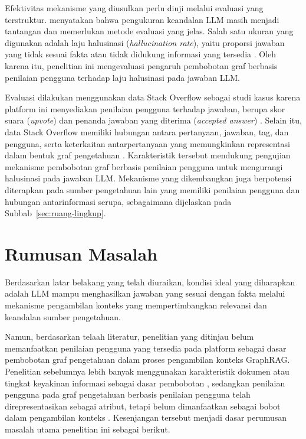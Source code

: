 Efektivitas mekanisme yang diusulkan perlu diuji melalui evaluasi yang terstruktur. \textcite{Gu2026} menyatakan bahwa pengukuran keandalan LLM masih menjadi tantangan dan memerlukan metode evaluasi yang jelas. Salah satu ukuran yang digunakan adalah laju halusinasi (\emph{hallucination rate}), yaitu proporsi jawaban yang tidak sesuai fakta atau tidak didukung informasi yang tersedia \autocite{Syeda2026}. Oleh karena itu, penelitian ini mengevaluasi pengaruh pembobotan graf berbasis penilaian pengguna terhadap laju halusinasi pada jawaban LLM.

Evaluasi dilakukan menggunakan data Stack Overflow sebagai studi kasus karena platform ini menyediakan penilaian pengguna terhadap jawaban, berupa skor suara (\emph{upvote}) dan penanda jawaban yang diterima (\emph{accepted answer}) \autocite{Kleybolte2026}. Selain itu, data Stack Overflow memiliki hubungan antara pertanyaan, jawaban, tag, dan pengguna, serta keterkaitan antarpertanyaan yang memungkinkan representasi dalam bentuk graf pengetahuan \autocite{Fatima2026}. Karakteristik tersebut mendukung pengujian mekanisme pembobotan graf berbasis penilaian pengguna untuk mengurangi halusinasi pada jawaban LLM. Mekanisme yang dikembangkan juga berpotensi diterapkan pada sumber pengetahuan lain yang memiliki penilaian pengguna dan hubungan antarinformasi serupa, sebagaimana dijelaskan pada Subbab~\ref{sec:ruang-lingkup}.

\section{Rumusan Masalah}

Berdasarkan latar belakang yang telah diuraikan, kondisi ideal yang diharapkan adalah LLM mampu menghasilkan jawaban yang sesuai dengan fakta melalui mekanisme pengambilan konteks yang mempertimbangkan relevansi dan keandalan sumber pengetahuan.

Namun, berdasarkan telaah literatur, penelitian yang ditinjau belum memanfaatkan penilaian pengguna yang tersedia pada platform sebagai dasar pembobotan graf pengetahuan dalam proses pengambilan konteks GraphRAG. Penelitian sebelumnya lebih banyak menggunakan karakteristik dokumen atau tingkat keyakinan informasi sebagai dasar pembobotan \autocite{Shi2026, Asghari2026}, sedangkan penilaian pengguna pada graf pengetahuan berbasis penilaian pengguna telah direpresentasikan sebagai atribut, tetapi belum dimanfaatkan sebagai bobot dalam pengambilan konteks \autocite{Kleybolte2026, Banerjee2024}. Kesenjangan tersebut menjadi dasar perumusan masalah utama penelitian ini sebagai berikut.

